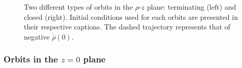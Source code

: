 \begin{figure}[!htbp]
  \centering
  \caption{Two different types of orbits in the $\rho$-$z$ plane: terminating (left) and closed (right). Initial conditions used for each orbits are presented in their respective captions. The dashed trajectory represents that of negative $\dot{\overline{\rho}}(0)$.}
  \label{ch:penrose_binaries/fig:rho_z_orbits}
\end{figure}

\subsubsection{Orbits in the $z=0$ plane}

